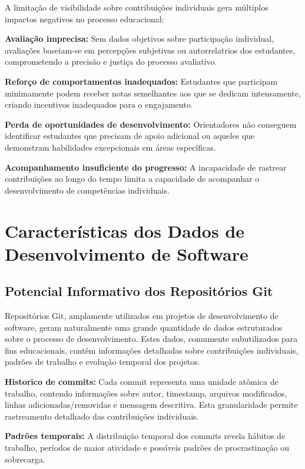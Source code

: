 \documentclass[english, spanish, brazilian]{RBIEarticle} %
\begin{document}
A limitação de visibilidade sobre contribuições individuais gera múltiplos impactos negativos no processo educacional:

\textbf{Avaliação imprecisa:} Sem dados objetivos sobre participação individual, avaliações baseiam-se em percepções subjetivas ou autorrelatrios dos estudantes, comprometendo a precisão e justiça do processo avaliativo.

\textbf{Reforço de comportamentos inadequados:} Estudantes que participam minimamente podem receber notas semelhantes aos que se dedicam intensamente, criando incentivos inadequados para o engajamento.

\textbf{Perda de oportunidades de desenvolvimento:} Orientadores não conseguem identificar estudantes que precisam de apoio adicional ou aqueles que demonstram habilidades excepcionais em áreas específicas.

\textbf{Acompanhamento insuficiente do progresso:} A incapacidade de rastrear contribuições ao longo do tempo limita a capacidade de acompanhar o desenvolvimento de competências individuais.

\section{Características dos Dados de Desenvolvimento de Software}

\subsection{Potencial Informativo dos Repositórios Git}

Repositórios Git, amplamente utilizados em projetos de desenvolvimento de software, geram naturalmente uma grande quantidade de dados estruturados sobre o processo de desenvolvimento. Estes dados, comumente subutilizados para fins educacionais, contêm informações detalhadas sobre contribuições individuais, padrões de trabalho e evolução temporal dos projetos.

\textbf{Historico de commits:} Cada commit representa uma unidade atômica de trabalho, contendo informações sobre autor, timestamp, arquivos modificados, linhas adicionadas/removidas e mensagem descritiva. Esta granularidade permite rastreamento detalhado das contribuições individuais.

\textbf{Padrões temporais:} A distribuição temporal dos commits revela hábitos de trabalho, períodos de maior atividade e possíveis padrões de procrastinação ou sobrecarga.
\end{document}
